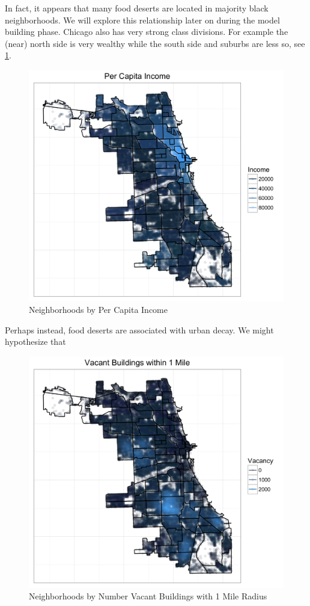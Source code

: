 \documentclass{report}
\begin{document}
In fact, it appears that many food deserts are located in majority black neighborhoods. We will explore this relationship later on during the model building phase. Chicago also has very strong class divisions. For example the (near) north side is very wealthy while the south side and suburbs are less so,  see \ref{fig:income}. 

\begin{figure}[h!]
  \includegraphics[scale=.2]{income_plot}
  \caption{Neighborhoods by Per Capita Income}
  \label{fig:income}
\end{figure}

Perhaps instead, food deserts are associated with urban decay. We might hypothesize that 

\begin{figure}[h!]
  \includegraphics[scale=.2]{vacant_plot}
  \caption{Neighborhoods by Number Vacant Buildings with 1 Mile Radius}
  \label{fig:vacant}
\end{figure}
\end{document}
